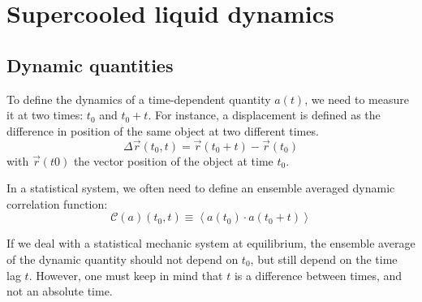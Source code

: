 %

\section{Supercooled liquid dynamics}
\label{sec:sc_dynamics}

\subsection{Dynamic quantities}
\label{sec:isf_msd}

To define the dynamics of a time-dependent quantity $a(t)$, we need to measure it at two times: $t_0$ and $t_0+t$. For instance, a displacement is defined as the difference in position of the same object at two different times. 
\begin{equation}
	\Delta \vec{r}(t_0, t) = \vec{r}(t_0+t) - \vec{r}(t_0)
	\label{eq:displacement}
\end{equation}
with $\vec{r}(t0)$ the vector position of the object at time $t_0$.

In a statistical system, we often need to define an ensemble averaged dynamic correlation function:
\begin{equation}
	\mathcal{C}(a)(t_0, t) \equiv \left\langle a(t_0) \cdot a(t_0+t) \right\rangle
	\label{eq:correlation}
\end{equation}

If we deal with a statistical mechanic system at equilibrium, the ensemble average of the dynamic quantity should not depend on $t_0$, but still depend on the time lag $t$. However, one must keep in mind that $t$ is a difference between times, and not an absolute time. 

